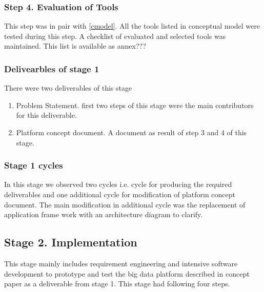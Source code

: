 \subsubsection{Step 4. Evaluation of Tools}
This step was in pair with \ref{cmodel}. All the tools listed in conceptual model were tested during this step. A checklist of evaluated and selected tools was maintained. This list is available as annex???

\subsubsection{Delivearbles of stage 1}
There were two deliverables of this stage
\begin{enumerate}
\item Problem Statement. first two steps of this stage were the main contributors for this deliverable.
\item Platform concept document. A document as result of step 3 and 4 of this stage. 
\end{enumerate}

\subsubsection{Stage 1 cycles}
In this stage we observed two cycles i.e. cycle for producing the required deliverables and one additional cycle for modification of platform concept document. The main modification in additional cycle was the replacement of application frame work with an architecture diagram to clarify.
\subsection{Stage 2. Implementation}\label{implement}
This stage mainly includes requirement engineering and intensive software development to prototype and test the big data platform described in concept paper as a deliverable from stage 1. This stage had following four steps.
